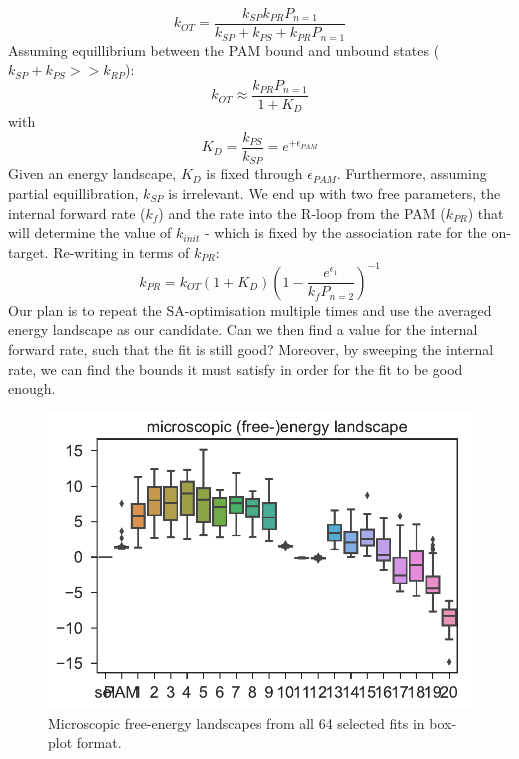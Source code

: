 \documentclass[a4paper,twoside]{revtex4-1}
\begin{document}
\begin{itemize}
\begin{enumerate}
	\end{enumerate}
    $$
    k_{OT} = \frac{k_{SP} k_{PR} P_{n=1}}{k_{SP} + k_{PS} + k_{PR}P_{n=1} }
    $$
    Assuming equillibrium between the PAM bound and unbound states ($k_{SP} + k_{PS} >> k_{RP}$):
    $$
   k_{OT} \approx \frac{k_{PR} P_{n=1}}{ 1 + K_{D}}
   $$ 
    with 
   $$ 
   K_{D} = \frac{k_{PS}}{k_{SP}} = e^{+\epsilon_{PAM}}
   $$
   Given an energy landscape, $K_D$ is fixed through $\epsilon_{PAM}$. Furthermore, assuming partial equillibration, $k_{SP}$ is irrelevant. We end up with two free parameters, the internal forward rate ($k_f$) and the rate into the R-loop from the PAM ($k_{PR}$) that will determine the value of $k_{init}$ - which is fixed by the association rate for the on-target. 
    Re-writing in terms of $k_{PR}$: 
   $$ 
   k_{PR} = k_{OT} (1 + K_D) (1 - \frac{ e^{\epsilon_1} }{ k_f P_{n=2}}   )^{-1}
   $$ 
   Our plan is to repeat the SA-optimisation multiple times and use the averaged energy landscape as our candidate. 
   Can we then find a value for the internal forward rate, such that the fit is still good? 
   Moreover, by sweeping the internal rate, we can find the bounds it must satisfy in order for the fit to be good enough.
\end{itemize}

\begin{figure}[H]
\centering
\includegraphics[scale=0.5]{fig1_15_11_2018.pdf}
\caption{Microscopic free-energy landscapes from all 64 selected fits in box-plot format.}
\end{figure}
\end{document}
